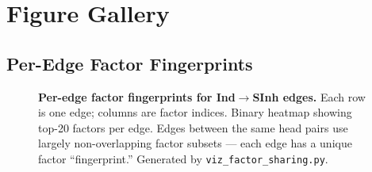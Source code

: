\documentclass[11pt]{article}
\begin{document}
%
%

%

\section{Figure Gallery}
\label{app:figures}

%

\subsection{Per-Edge Factor Fingerprints}
\label{fig:per_edge_fingerprints}

\begin{figure}[h!]
\centering
\caption{\textbf{Per-edge factor fingerprints for Ind$\to$SInh edges.}
Each row is one edge; columns are factor indices. Binary heatmap
showing top-20 factors per edge. Edges between the same head pairs
use largely non-overlapping factor subsets --- each edge has a unique
factor ``fingerprint.'' Generated by \texttt{viz\_factor\_sharing.py}.}
\end{figure}
\end{document}
